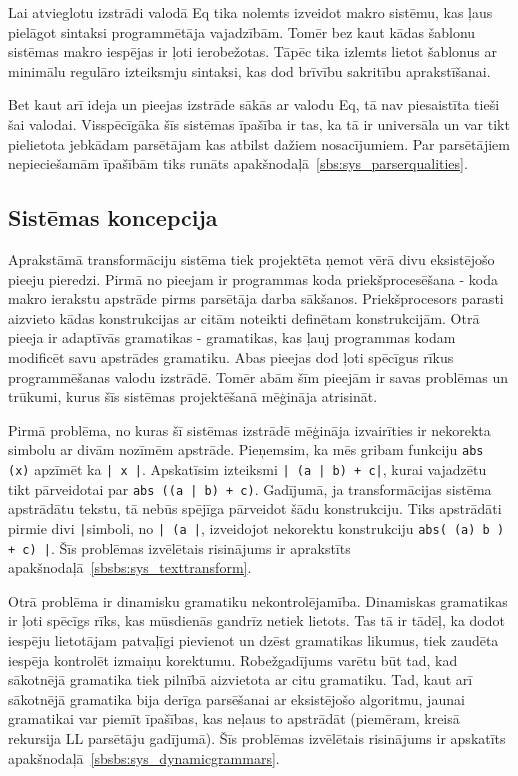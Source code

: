 Lai atvieglotu izstrādi valodā Eq tika nolemts izveidot makro sistēmu, kas ļaus pielāgot sintaksi programmētāja vajadzībām. Tomēr bez kaut kādas šablonu sistēmas makro iespējas ir ļoti ierobežotas. Tāpēc tika izlemts lietot šablonus ar minimālu regulāro izteiksmju sintaksi, kas dod brīvību sakritību aprakstīšanai. 

Bet kaut arī ideja un pieejas izstrāde sākās ar valodu Eq, tā nav piesaistīta tieši šai valodai. Visspēcīgāka šīs sistēmas īpašība ir tas, ka tā ir universāla un var tikt pielietota jebkādam parsētājam kas atbilst dažiem nosacījumiem. Par parsētājiem nepieciešamām īpašībām tiks runāts apakšnodaļā~\ref{sbs:sys_parserqualities}.

\subsection{\label{sbs:sys_approach}Sistēmas koncepcija}

Aprakstāmā transformāciju sistēma tiek projektēta ņemot vērā divu eksistējošo pieeju pieredzi. Pirmā no pieejam ir programmas koda priekšprocesēšana - koda makro ierakstu apstrāde pirms parsētāja darba sākšanos. Priekšprocesors parasti aizvieto kādas konstrukcijas ar citām noteikti definētam konstrukcijām. Otrā pieeja ir adaptīvās gramatikas - gramatikas, kas ļauj programmas kodam modificēt savu apstrādes gramatiku. Abas pieejas dod ļoti spēcīgus rīkus programmēšanas valodu izstrādē. Tomēr abām šīm pieejām ir savas problēmas un trūkumi, kurus šīs sistēmas projektēšanā mēģināja atrisināt. 

Pirmā problēma, no kuras šī sistēmas izstrādē mēģināja izvairīties ir nekorekta simbolu ar divām nozīmēm apstrāde. Pieņemsim, ka mēs gribam funkciju \verb|abs (x)| apzīmēt ka \verb/| x |/. Apskatīsim izteiksmi \verb/| (a | b) + c|/, kurai vajadzētu tikt pārveidotai par \verb/abs ((a | b) + c)/. Gadījumā, ja transformācijas sistēma apstrādātu tekstu, tā nebūs spējīga pārveidot šādu konstrukciju. Tiks apstrādāti pirmie divi \verb/|/simboli, no \verb/| (a |/, izveidojot nekorektu konstrukciju \verb/abs( (a) b ) + c) |/. Šīs problēmas izvēlētais risinājums ir aprakstīts apakšnodaļā~\ref{sbsbs:sys_texttransform}.

Otrā problēma ir dinamisku gramatiku nekontrolējamība. Dinamiskas gramatikas ir ļoti spēcīgs rīks, kas mūsdienās gandrīz netiek lietots. Tas tā ir tādēļ, ka dodot iespēju lietotājam patvaļīgi pievienot un dzēst gramatikas likumus, tiek zaudēta iespēja kontrolēt izmaiņu korektumu. Robežgadījums varētu būt tad, kad sākotnējā gramatika tiek pilnībā aizvietota ar citu gramatiku. Tad, kaut arī sākotnējā gramatika bija derīga parsēšanai ar eksistējošo algoritmu, jaunai gramatikai var piemīt īpašības, kas neļaus to apstrādāt (piemēram, kreisā rekursija LL parsētāju gadījumā). Šīs problēmas izvēlētais risinājums ir apskatīts apakšnodaļā~\ref{sbsbs:sys_dynamicgrammars}.

